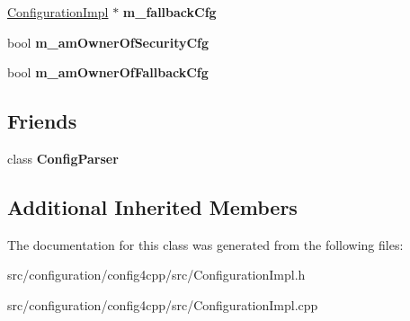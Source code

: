 \begin{DoxyCompactItemize}
\item 
\hypertarget{classCONFIG4CPP__NAMESPACE_1_1ConfigurationImpl_ad2dc554176ded91ad409dc90bded0a45}{\hyperlink{classCONFIG4CPP__NAMESPACE_1_1ConfigurationImpl}{Configuration\-Impl} $\ast$ {\bfseries m\-\_\-fallback\-Cfg}}\label{classCONFIG4CPP__NAMESPACE_1_1ConfigurationImpl_ad2dc554176ded91ad409dc90bded0a45}

\item 
\hypertarget{classCONFIG4CPP__NAMESPACE_1_1ConfigurationImpl_a4e2bfc60e1d1f8e1379132d418383d91}{bool {\bfseries m\-\_\-am\-Owner\-Of\-Security\-Cfg}}\label{classCONFIG4CPP__NAMESPACE_1_1ConfigurationImpl_a4e2bfc60e1d1f8e1379132d418383d91}

\item 
\hypertarget{classCONFIG4CPP__NAMESPACE_1_1ConfigurationImpl_a06bc13a97b9311417533411fd0efd057}{bool {\bfseries m\-\_\-am\-Owner\-Of\-Fallback\-Cfg}}\label{classCONFIG4CPP__NAMESPACE_1_1ConfigurationImpl_a06bc13a97b9311417533411fd0efd057}

\end{DoxyCompactItemize}
\subsection*{Friends}
\begin{DoxyCompactItemize}
\item 
\hypertarget{classCONFIG4CPP__NAMESPACE_1_1ConfigurationImpl_a26bfbd623d9dac71aeaaa26ac67820b6}{class {\bfseries Config\-Parser}}\label{classCONFIG4CPP__NAMESPACE_1_1ConfigurationImpl_a26bfbd623d9dac71aeaaa26ac67820b6}

\end{DoxyCompactItemize}
\subsection*{Additional Inherited Members}


The documentation for this class was generated from the following files\-:\begin{DoxyCompactItemize}
\item 
src/configuration/config4cpp/src/Configuration\-Impl.\-h\item 
src/configuration/config4cpp/src/Configuration\-Impl.\-cpp\end{DoxyCompactItemize}
